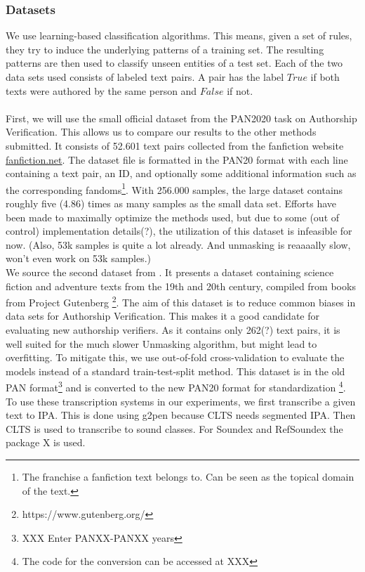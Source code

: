 \subsubsection{Datasets}
We use learning-based classification algorithms.
This means, given a set of rules, they try to induce the underlying patterns of a training set.
The resulting patterns are then used to classify unseen entities of a test set.
Each of the two data sets used consists of labeled text pairs.
A pair has the label $True$ if both texts were authored by the same person and $False$ if not.\\\\
First, we will use the small official dataset from the PAN2020 task on Authorship Verification.
This allows us to compare our results to the other methods submitted.
It consists of 52.601 text pairs collected from the fanfiction website \url{fanfiction.net}.
The dataset file is formatted in the PAN20 format with each line containing a text pair, an ID, and optionally some additional information such as the corresponding fandoms\footnote{The franchise a fanfiction text belongs to. Can be seen as the topical domain of the text.}.
With 256.000 samples, the large dataset contains roughly five (4.86) times as many samples as the small data set.
Efforts have been made to maximally optimize the methods used, but due to some (out of control) implementation details(?), the utilization of this dataset is infeasible for now. (Also, 53k samples is quite a lot already.
And unmasking is reaaaally slow, won't even work on 53k samples.)\\
We source the second dataset from \cite{stein2019unbiasedGutenbergCorpus}.
It presents a dataset containing science fiction and adventure texts from the 19th and 20th century, compiled from books from Project Gutenberg \footnote{https://www.gutenberg.org/}.
The aim of this dataset is to reduce common biases in data sets for Authorship Verification.
This makes it a good candidate for evaluating new authorship verifiers.
As it contains only 262(?) text pairs, it is well suited for the much slower Unmasking algorithm, but might lead to overfitting.
To mitigate this, we use out-of-fold cross-validation to evaluate the models instead of a standard train-test-split method.
This dataset is in the old PAN format\footnote{XXX Enter PANXX-PANXX years} and is converted to the new PAN20 format for standardization \footnote{The code for the conversion can be accessed at XXX}.\\
To use these transcription systems in our experiments, we first transcribe a given text to IPA.
This is done using g2pen because CLTS needs segmented IPA.  %
Then CLTS is used to transcribe to sound classes.
For Soundex and RefSoundex the package X is used.


